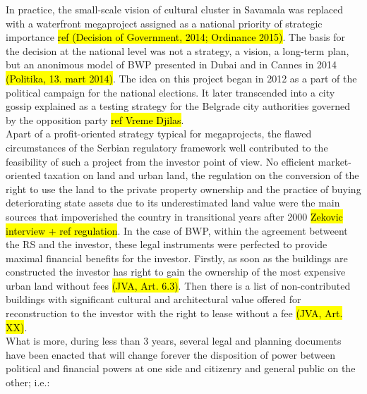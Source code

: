 \documentclass[11pt]{report}
\begin{document}
In practice, the small-scale vision of cultural cluster in Savamala was replaced with a waterfront megaproject assigned as a national priority of strategic importance \hl{ref (Decision of Government, 2014; Ordinance  2015)}. 
The basis for the decision at the national level was not a strategy, a vision, a long-term plan, but an anonimous model of BWP presented in Dubai and in Cannes in 2014 \hl{(Politika, 13. mart 2014)}.
The idea on this project began in 2012 as a part of the political campaign for the national elections. It later transcended into a city gossip explained as a testing strategy for the Belgrade city authorities governed by the opposition party \hl{ref Vreme Djilas}. 
\\
Apart of a profit-oriented strategy typical for megaprojects, the flawed circumstances of the Serbian regulatory framework well contributed to the feasibility of such a project from the investor point of view.
No efficient market-oriented taxation on land and urban land, the regulation on the conversion of the right to use the land to the private property ownership and the practice of buying deteriorating state assets due to its underestimated land value were the main sources that impoverished the country in transitional years after 2000 \hl{Zekovic interview + ref regulation}.
In the case of BWP, within the agreement betweent the RS and the investor, these legal instruments were perfected to provide maximal financial benefits for the investor.
Firstly, as soon as the buildings are constructed the investor has right to gain the ownership of the most expensive urban land without fees \hl{(JVA, Art. 6.3)}. Then there is a list of non-contributed buildings with significant cultural and architectural value offered for reconstruction to the investor with the right to lease without a fee \hl{(JVA, Art. XX)}.
\\
What is more, during less than 3 years, several legal and planning documents have been enacted that will change forever the disposition of power between political and financial powers at one side and citizenry and general public on the other; i.e.:
\end{document}
